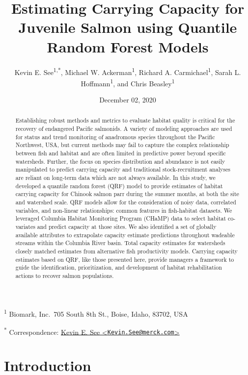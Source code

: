 \documentclass[
  12pt,
]{article}
\title{Estimating Carrying Capacity for Juvenile Salmon using Quantile Random Forest Models}
\author{Kevin E. See\textsuperscript{1,*}, Michael W. Ackerman\textsuperscript{1}, Richard A. Carmichael\textsuperscript{1}, Sarah L. Hoffmann\textsuperscript{1}, and Chris Beasley\textsuperscript{1}}
\date{December 02, 2020}
\begin{document}
\maketitle
\begin{abstract}
Establishing robust methods and metrics to evaluate habitat quality is critical for the recovery of endangered Pacific salmonids. A variety of modeling approaches are used for status and trend monitoring of anadromous species throughout the Pacific Northwest, USA, but current methods may fail to capture the complex relationship between fish and habitat and are often limited in predictive power beyond specific watersheds. Further, the focus on species distribution and abundance is not easily manipulated to predict carrying capacity and traditional stock-recruitment analyses are reliant on long-term data which are not always available. In this study, we developed a quantile random forest (QRF) model to provide estimates of habitat carrying capacity for Chinook salmon parr during the summer months, at both the site and watershed scale. QRF models allow for the consideration of noisy data, correlated variables, and non-linear relationships: common features in fish-habitat datasets. We leveraged Columbia Habitat Monitoring Program (CHaMP) data to select habitat co-variates and predict capacity at those sites. We also identified a set of globally available attributes to extrapolate capacity estimate predictions throughout wadeable streams within the Columbia River basin. Total capacity estimates for watersheds closely matched estimates from alternative fish productivity models. Carrying capacity estimates based on QRF, like those presented here, provide managers a framework to guide the identification, prioritization, and development of habitat rehabilitation actions to recover salmon populations.
\end{abstract}

\textsuperscript{1} Biomark, Inc.~705 South 8th St., Boise, Idaho, 83702, USA

\textsuperscript{*} Correspondence: \href{mailto:Kevin.See@merck.com}{Kevin E. See \textless{}\href{mailto:Kevin.See@merck.com}{\nolinkurl{Kevin.See@merck.com}}\textgreater{}}

\hypertarget{introduction}{%
\section{Introduction}\label{introduction}}
\end{document}
